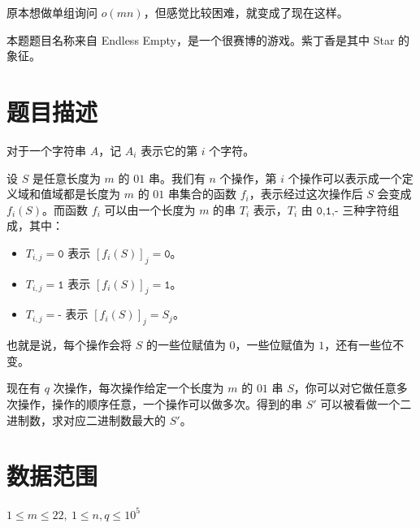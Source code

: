 \documentclass[a4paper,10pt]{article}
\begin{document}
原本想做单组询问 $o(mn)$，但感觉比较困难，就变成了现在这样。

本题题目名称来自 Endless Empty，是一个很赛博的游戏。紫丁香是其中 Star 的象征。

\section*{题目描述}

对于一个字符串 $A$，记 $A_i$ 表示它的第 $i$ 个字符。

设 $S$ 是任意长度为 $m$ 的 $01$ 串。我们有 $n$ 个操作，第 $i$ 个操作可以表示成一个定义域和值域都是长度为 $m$ 的 $01$ 串集合的函数 $f_i$，表示经过这次操作后 $S$ 会变成 $f_i(S)$。而函数 $f_i$ 可以由一个长度为 $m$ 的串 $T_i$ 表示，$T_i$ 由 $\texttt{0,1,-}$ 三种字符组成，其中：

\begin{itemize}
\item $T_{i,j}=\texttt{0}$ 表示 $[f_i(S)]_j=\texttt{0}$。

\item $T_{i,j}=\texttt{1}$ 表示 $[f_i(S)]_j=\texttt{1}$。

\item $T_{i,j}=\texttt{-}$ 表示 $[f_i(S)]_j=S_j$。
\end{itemize}

也就是说，每个操作会将 $S$ 的一些位赋值为 $0$，一些位赋值为 $1$，还有一些位不变。

现在有 $q$ 次操作，每次操作给定一个长度为 $m$ 的 $01$ 串 $S$，你可以对它做任意多次操作，操作的顺序任意，一个操作可以做多次。得到的串 $S'$ 可以被看做一个二进制数，求对应二进制数最大的 $S'$。

\section*{数据范围}

$1\leq m\leq 22,\ 1\leq n,q\leq 10^5$

\newpage
\end{document}
